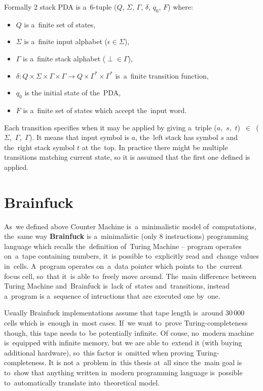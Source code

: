 \documentclass[english,shortabstract,mgr]{iithesis}
\begin{document}
Formally 2 stack PDA is a~$6$-tuple ($Q$, $\Sigma$, $\Gamma$, $\delta$, $q_0$, $F$) where:
\begin{itemize}
  \item $Q$ is a~finite set of states,
  \item $\Sigma$ is a~finite input alphabet ($\epsilon \in \Sigma$),
  \item $\Gamma$ is a~finite stack alphabet ($\perp \in \Gamma$),
  \item $\delta: Q \times \Sigma \times \Gamma \times \Gamma \rightarrow
      Q \times \Gamma^* \times \Gamma^*$ is~a~finite transition function,
  \item $q_0$ is the initial state of the~PDA,
  \item $F$ is a~finite set of states which accept the~input word.
\end{itemize}

Each transition specifies when it may be applied by giving a~triple
($a$,~$s$,~$t$)~$\in$~($\Sigma$,~$\Gamma$,~$\Gamma$). It means that input symbol is $a$,
the~left stack has symbol $s$ and the~right stack symbol $t$ at the~top. In practice there
might be multiple transitions matching current state, so it is assumed that the first one
defined is applied.

\section{Brainfuck}

As~we defined above Counter Machine is~a~minimalistic model of~computations, the~same way
\textbf{Brainfuck} \cite{brainfuckWiki} is a~minimalistic (only 8 instructions) programming
language which recalls
the~definition of~Turing Machine -- program operates on~a~tape containing numbers, it~is possible
to~explicitly read and~change values in~cells. A~program operates on~a~data pointer which
points to~the~current focus cell, so~that it~is able to~freely move around. The~main difference
between Turing Machine and~Brainfuck is~lack of~states and~transitions, instead a~program
is a~sequence of intructions that are executed one by~one.

Usually Brainfuck implementations assume that tape length is~around $30\,000$ cells which
is~enough in~most cases. If~we want to~prove Turing-completeness though, this tape
needs to~be potentially infinite. Of couse, no~modern machine is~equipped with infinite memory,
but we are able to~extend it (with buying additional hardware), so~this factor is~omitted
when proving Turing-completeness. It is not a~problem in~this thesis at~all since
the~main goal is to~show that anything written in~modern programming language is~possible
to~automatically translate into~theoretical model.
\end{document}
